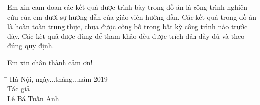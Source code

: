 \par 
Em xin cam đoan các kết quả được trình bày trong đồ án là công trình nghiên cứu của em dưới sự hướng dẫn của giáo viên hướng dẫn. Các kết quả trong đồ án là hoàn toàn trung thực, chưa được công bố trong bất kỳ công trình nào trước đây. Các kết quả được dùng để tham khảo đều được trích dẫn đầy đủ và theo đúng quy định.
\par 
Em xin chân thành cảm ơn!
\begin{tabbing}
 \hspace{9.5cm}\=\kill
   \> Hà Nội, ngày...tháng...năm 2019\\ 
   \>  \hspace{2.5cm}    Tác giả\\ 
   \>   \hspace{1.5cm}  Lê Bá Tuấn Anh		
 \end{tabbing} 